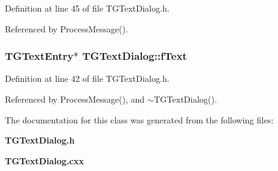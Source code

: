 Definition at line 45 of file TGTextDialog.h.

Referenced by ProcessMessage().
\subsubsection[{fText}]{\setlength{\rightskip}{0pt plus 5cm}TGTextEntry$\ast$ {\bf TGTextDialog::fText}\hspace{0.3cm}{\ttfamily  [protected]}}\label{classTGTextDialog_af57e9948a5b6cf5d6db6322b16383a01}


Definition at line 42 of file TGTextDialog.h.

Referenced by ProcessMessage(), and $\sim$TGTextDialog().

The documentation for this class was generated from the following files:\begin{DoxyCompactItemize}
\item 
{\bf TGTextDialog.h}\item 
{\bf TGTextDialog.cxx}\end{DoxyCompactItemize}
